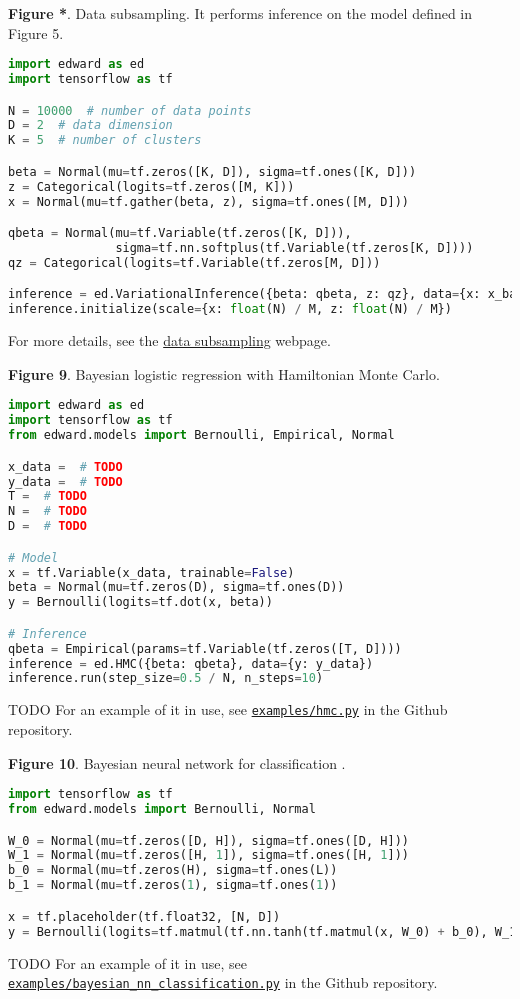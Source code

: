\textbf{Figure *}. Data subsampling.
It performs inference on the model defined in Figure 5.
\begin{lstlisting}[language=python]
import edward as ed
import tensorflow as tf

N = 10000  # number of data points
D = 2  # data dimension
K = 5  # number of clusters

beta = Normal(mu=tf.zeros([K, D]), sigma=tf.ones([K, D]))
z = Categorical(logits=tf.zeros([M, K]))
x = Normal(mu=tf.gather(beta, z), sigma=tf.ones([M, D]))

qbeta = Normal(mu=tf.Variable(tf.zeros([K, D])),
               sigma=tf.nn.softplus(tf.Variable(tf.zeros[K, D])))
qz = Categorical(logits=tf.Variable(tf.zeros[M, D]))

inference = ed.VariationalInference({beta: qbeta, z: qz}, data={x: x_batch})
inference.initialize(scale={x: float(N) / M, z: float(N) / M})
\end{lstlisting}
For more details, see the
\href{/api/data-subsampling}{data subsampling} webpage.

\textbf{Figure 9}. Bayesian logistic regression with Hamiltonian Monte Carlo.
\begin{lstlisting}[language=python]
import edward as ed
import tensorflow as tf
from edward.models import Bernoulli, Empirical, Normal

x_data =  # TODO
y_data =  # TODO
T =  # TODO
N =  # TODO
D =  # TODO

# Model
x = tf.Variable(x_data, trainable=False)
beta = Normal(mu=tf.zeros(D), sigma=tf.ones(D))
y = Bernoulli(logits=tf.dot(x, beta))

# Inference
qbeta = Empirical(params=tf.Variable(tf.zeros([T, D])))
inference = ed.HMC({beta: qbeta}, data={y: y_data})
inference.run(step_size=0.5 / N, n_steps=10)
\end{lstlisting}
TODO
For an example of it in use, see
\href{https://github.com/blei-lab/edward/blob/master/examples/hmc.py}{\texttt{examples/hmc.py}}
in the Github repository.

\textbf{Figure 10}. Bayesian neural network for classification \citep{denker1987large}.
\begin{lstlisting}[language=python]
import tensorflow as tf
from edward.models import Bernoulli, Normal

W_0 = Normal(mu=tf.zeros([D, H]), sigma=tf.ones([D, H]))
W_1 = Normal(mu=tf.zeros([H, 1]), sigma=tf.ones([H, 1]))
b_0 = Normal(mu=tf.zeros(H), sigma=tf.ones(L))
b_1 = Normal(mu=tf.zeros(1), sigma=tf.ones(1))

x = tf.placeholder(tf.float32, [N, D])
y = Bernoulli(logits=tf.matmul(tf.nn.tanh(tf.matmul(x, W_0) + b_0), W_1) + b_1)
\end{lstlisting}
TODO
For an example of it in use, see
\href{https://github.com/blei-lab/edward/blob/master/examples/bayesian_nn_classification.py}{\texttt{examples/bayesian_nn_classification.py}}
in the Github repository.

